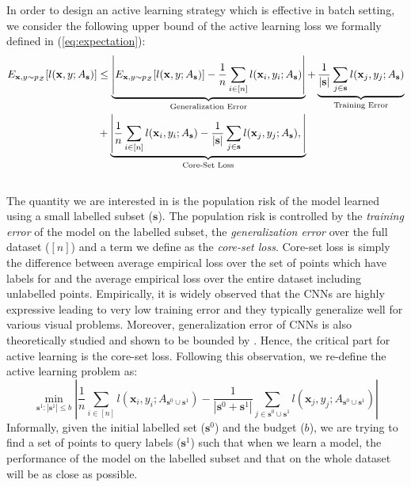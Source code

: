 \documentclass{article} %
\begin{document}
In order to design an active learning strategy which is effective in batch setting, we consider the following upper
bound of the active learning loss we formally defined in (\ref{eq:expectation}):
{ \small 
\begin{equation} \begin{aligned} 
E_{\mathbf{x},y \sim p_\mathcal{Z}} [l(\mathbf{x},y; A_{\mathbf{s}})]  &\leq \underbrace{\left| E_{\mathbf{x},y \sim p_\mathcal{Z}} [l(\mathbf{x},y; A_{\mathbf{s}})] - \frac{1}{n}\sum_{i \in [n]} l(\mathbf{x}_i,y_i; A_{\mathbf{s}}) \right|}_{\text{Generalization Error}}  + \underbrace{\frac{1}{|\mathbf{s}|}\sum_{j \in \mathbf{s}} l(\mathbf{x}_j,y_j; A_{\mathbf{s}})}_{\text{Training Error}} \\ &+
   \underbrace{\left| \frac{1}{n}\sum_{i \in [n]} l(\mathbf{x}_i,y_i; A_{\mathbf{s}}) - \frac{1}{|\mathbf{s}|}\sum_{j \in \mathbf{s}} l(\mathbf{x}_j,y_j; A_{\mathbf{s}}), \right|}_{\text{Core-Set Loss}} 
   \\ &
\end{aligned} \vspace{-3mm} \end{equation} }
The quantity we are interested in is the population risk of the model learned using a small labelled subset ($\mathbf{s}$).
The population risk is controlled by the \emph{training error} of the model on the labelled subset, the \emph{generalization error} over the
full dataset ($[n]$) and a term we define as the \emph{core-set loss}. Core-set loss is simply the
difference between average empirical loss over the set of points which have labels for and the average empirical loss over the entire
dataset including unlabelled points. Empirically, it is widely observed that the CNNs are highly expressive leading to very low training error and they typically generalize well for various visual problems. Moreover, generalization error of CNNs is also theoretically studied and shown to be bounded by \citet{robust}. Hence, the critical part for active learning is the core-set loss. Following this observation, we re-define the active learning problem as:
\begin{equation} \min_{\mathbf{s}^1 : |\mathbf{s}^1| \leq b} 
\left| \frac{1}{n}\sum_{i \in [n]} l(\mathbf{x}_i,y_i; A_{\mathbf{s}^0 \cup \mathbf{s}^1}) -
    \frac{1}{|\mathbf{s}^0+\mathbf{s}^1|}\sum_{j \in \mathbf{s}^0 \cup \mathbf{s}^1} l(\mathbf{x}_j,y_j;A_{\mathbf{s}^0 \cup \mathbf{s}^1})
    \right|
    \label{eq:new_active_learning}
\end{equation} 
Informally, given the initial labelled set ($\mathbf{s}^0$) and the budget ($b$), we are trying to find a set of points
to query labels ($\mathbf{s}^1$) such that when we learn a model, the performance of the model on the labelled subset
and that on the whole dataset will be as close as possible.
\end{document}
